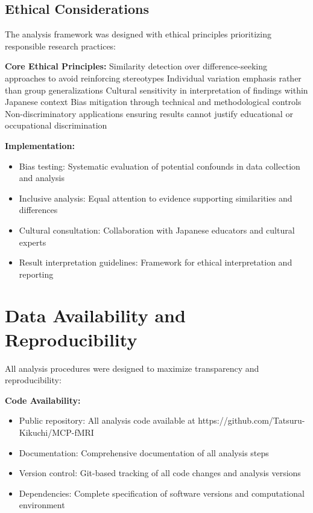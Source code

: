 \documentclass[12pt, a4paper]{article}
\begin{document}
\subsection{Ethical Considerations}
The analysis framework was designed with ethical principles prioritizing responsible research practices:

\vspace{0.5\baselineskip}
\noindent
\textbf{Core Ethical Principles:}
Similarity detection over difference-seeking approaches to avoid reinforcing stereotypes
Individual variation emphasis rather than group generalizations
Cultural sensitivity in interpretation of findings within Japanese context
Bias mitigation through technical and methodological controls
Non-discriminatory applications ensuring results cannot justify educational or occupational discrimination

\noindent
\textbf{Implementation:}
\begin{itemize}
\item Bias testing: Systematic evaluation of potential confounds in data collection and analysis
\item Inclusive analysis: Equal attention to evidence supporting similarities and differences
\item Cultural consultation: Collaboration with Japanese educators and cultural experts
\item Result interpretation guidelines: Framework for ethical interpretation and reporting
\end{itemize}


\section{Data Availability and Reproducibility}
All analysis procedures were designed to maximize transparency and reproducibility:

\vspace{0.5\baselineskip}
\noindent
\textbf{Code Availability:}
\begin{itemize}
\item Public repository: All analysis code available at https://github.com/Tatsuru-Kikuchi/MCP-fMRI
\item Documentation: Comprehensive documentation of all analysis steps
\item Version control: Git-based tracking of all code changes and analysis versions
\item Dependencies: Complete specification of software versions and computational environment
\end{itemize}
\end{document}
